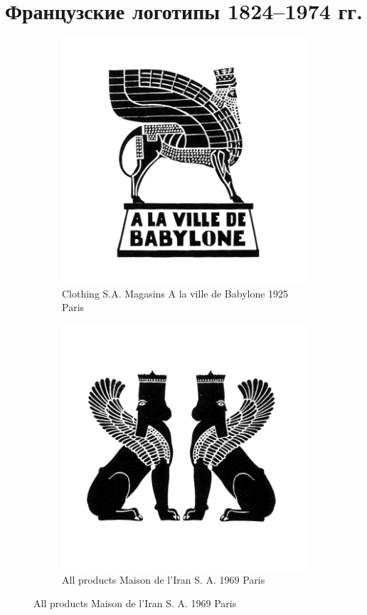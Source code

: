 \section{Французские логотипы 1824--1974 гг.}
\label{app:french-trademarks}

\begin{figure}[h]
  \centering
  \begin{subfigure}{.45\textwidth}
    \centering
    \includegraphics[width=.5\linewidth]{images/supplement/trademarks/french/1_1}
    \caption[]{Clothing S.A. Magasins A la ville de Babylone 1925 Paris}
    \label{fig:trademarks:french:1.1}
  \end{subfigure}\hfill
  \begin{subfigure}{.45\textwidth}
    \centering
    \includegraphics[width=.5\linewidth]{images/supplement/trademarks/french/1_2}
    \caption[]{All products Maison de l'Iran S. A. 1969 Paris}
    \label{fig:trademarks:french:1.2}
  \end{subfigure}


\end{figure}
